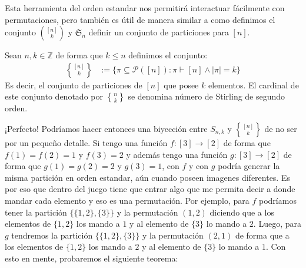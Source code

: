 \documentclass[12pt,a4paper,oneside]{memoir}
\DeclareRobustCommand{\stirling}{\genfrac\{\}{0pt}{}}
\begin{document}
Esta herramienta del orden estandar nos permitirá interactuar fácilmente con permutaciones, pero también es útil de manera similar a como definimos el conjunto $\binom{[n]}{k}$ y $\mathfrak{S}_n$ definir un conjunto de particiones para $[n]$.

\begin{definition}
    Sean $n, k \in \mathbb{Z}$ de forma que $k \le n$ definimos el conjunto:
    \begin{align*}
        \stirling{[n]}{k} &:= \{\pi \subseteq \mathcal{P}([n]) : \pi \vdash [n] \wedge |\pi| = k\}
    \end{align*}
    Es decir, el conjunto de particiones de $[n]$ que posee $k$ elementos. El cardinal de este conjunto denotado por $\stirling{n}{k}$ se denomina número de Stirling de segundo orden.
\end{definition}

¡Perfecto! Podríamos hacer entonces una biyección entre $S_{n, k}$ y $\stirling{[n]}{k}$ de no ser por un pequeño detalle. Si tengo una función $f: [3] \to [2]$ de forma que $f(1) = f(2) = 1$ y $f(3) = 2$ y además tengo una función $g: [3] \to [2]$ de forma que $g(1) = g(2) = 2$ y $g(3) = 1$, con $f$ y con $g$ podría generar la misma partición en orden estandar, aún cuando poseen imagenes diferentes. Es por eso que dentro del juego tiene que entrar algo que me permita decir a donde mandar cada elemento y eso es una permutación. Por ejemplo, para $f$ podríamos tener la partición $\{\{1, 2\}, \{3\}\}$ y la permutación $(1, 2)$ diciendo que a los elementos de $\{1, 2\}$ los mando a $1$ y al elemento de $\{3\}$ lo mando a $2$. Luego, para $g$ tendremos la partición $\{\{1, 2\}, \{3\}\}$ y la permutación $(2, 1)$ de forma que a los elementos de $\{1, 2\}$ los mando a $2$ y al elemento de $\{3\}$ lo mando a $1$. Con esto en mente, probaremos el siguiente teorema:
\end{document}
